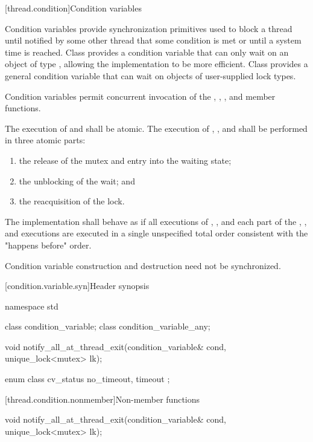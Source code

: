 [thread.condition]{Condition variables}

\pnum
Condition variables provide synchronization primitives used to block a thread until
notified by some other thread that some condition is met or until a system time is
reached. Class  provides a condition variable that can only
wait on an object of type , allowing the implementation
to be more efficient. Class  provides a general
condition variable that can wait on objects of user-supplied lock types.

\pnum
Condition variables permit concurrent invocation of the , ,
,  and  member functions.

\pnum
The execution of  and  shall be atomic. The
execution of , , and  shall be performed
in three atomic parts:
\begin{enumerate}
\item the release of the mutex and entry into the waiting state;
\item the unblocking of the wait; and
\item the reacquisition of the lock.
\end{enumerate}

\pnum
The implementation shall behave as if all executions of , , and each
part of the , , and  executions are
executed in a single unspecified total order consistent with the "happens before" order.

\pnum
Condition variable construction and destruction need not be synchronized.

[condition.variable.syn]{Header  synopsis}

%
%
\begin{codeblock}
namespace std {
  class condition_variable;
  class condition_variable_any;

  void notify_all_at_thread_exit(condition_variable& cond, unique_lock<mutex> lk);

  enum class cv_status { no_timeout, timeout };
}
\end{codeblock}

[thread.condition.nonmember]{Non-member functions}
%
\begin{itemdecl}
void notify_all_at_thread_exit(condition_variable& cond, unique_lock<mutex> lk);
\end{itemdecl}

